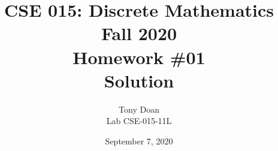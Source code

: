 \documentclass[11pt]{article}
\begin{document}
\author{Tony Doan\\
Lab CSE-015-11L }

\title{CSE 015: Discrete Mathematics\\
Fall 2020\\
Homework \#01\\
Solution}

\date{September 7, 2020}
\maketitle

\end{document}
